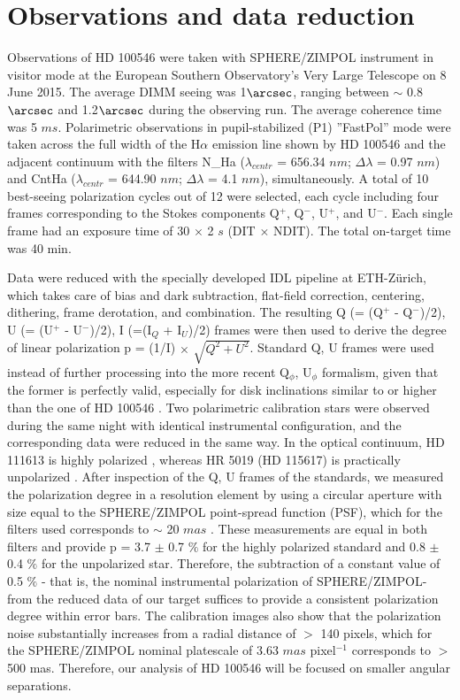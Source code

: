\documentclass{aa}
\begin{document}
\section{Observations and data reduction}
\label{Sect:Observations}
Observations of HD 100546 were taken with SPHERE/ZIMPOL instrument \citep{Beuzit08,Thalmann08} in visitor mode at the European Southern Observatory's Very Large Telescope on 8 June 2015. The average DIMM seeing was 1$\arcsec$, ranging between $\sim$ 0.8$\arcsec$ and 1.2$\arcsec$ during the observing run. The average coherence time was 5 $ms$. Polarimetric observations in pupil-stabilized (P1) ''FastPol'' mode were taken across the full width of the H$\alpha$ emission line shown by HD 100546 \citep{Fairlamb17} and the adjacent continuum with the filters N\_Ha ($\lambda$$_{centr}$ = 656.34 $nm$; $\Delta$$\lambda$ = 0.97 $nm$) and CntHa ($\lambda$$_{centr}$ = 644.90 $nm$; $\Delta$$\lambda$ = 4.1 $nm$), simultaneously. A total of 10 best-seeing polarization cycles out of 12 were selected, each cycle including four frames corresponding to the Stokes components Q$^+$, Q$^-$, U$^+$, and U$^-$. Each single frame had an exposure time of 30 $\times$ 2 $s$ (DIT $\times$ NDIT). The total on-target time was 40 min. 

Data were reduced with the specially developed IDL pipeline at ETH-Z\"urich, which takes care of bias and dark subtraction, flat-field correction, centering, dithering, frame derotation, and combination. The resulting Q (= (Q$^+$ - Q$^-$)/2), U (= (U$^+$ - U$^-$)/2), I (=(I$_Q$ + I$_U$)/2) frames were then used to derive the degree of linear polarization p = (1/I) $\times$ $\sqrt{Q^2 + U^2}$. Standard Q, U frames were used instead of further processing into the more recent Q$_\phi$, U$_\phi$ formalism, given that the former is perfectly valid, especially for disk inclinations similar to or higher than the one of HD 100546 \citep{Canovas15}. Two polarimetric calibration stars were observed during the same night with identical instrumental configuration, and the corresponding data were reduced in the same way. In the optical continuum, HD 111613 is highly polarized \citep[p = 3.1 $\pm$ 0.1 $\%$][]{Bastien88}, whereas HR 5019 (HD 115617) is practically unpolarized \citep[p = 0.010 $\pm$ 0.006$\%$][]{Leroy93}. After inspection of the Q, U frames of the standards, we measured the polarization degree in a resolution element by using a circular aperture with size equal to the SPHERE/ZIMPOL point-spread function (PSF), which for the filters used corresponds to $ \sim$ 20 $mas$ \citep[see also][]{Kervella16}. These measurements are equal in both filters and provide p = 3.7 $\pm$ 0.7 $\%$ for the highly polarized standard and 0.8 $\pm$ 0.4 $\%$ for the unpolarized star. Therefore, the subtraction of a constant value of 0.5 $\%$ - that is, the nominal instrumental polarization of SPHERE/ZIMPOL- from the reduced data of our target suffices to provide a consistent polarization degree within error bars. The calibration images also show that the polarization noise substantially increases from a radial distance of $>$ 140 pixels, which for the SPHERE/ZIMPOL nominal platescale of 3.63 $mas$ pixel$^{-1}$ \citep{Kervella15} corresponds to $>$ 500 mas. Therefore, our analysis of HD 100546 will be focused on smaller angular separations.
\end{document}
